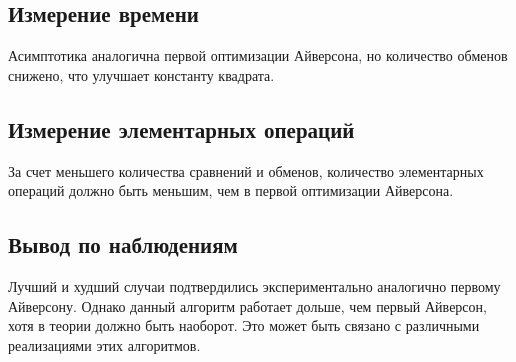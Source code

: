 \documentclass[11pt]{article}
\begin{document}
\setcounter{subsection}{0}
\subsection{Измерение времени}

\begin{center}
\end{center}
{ \hspace*{\fill} }

\begin{center}
\end{center}
{ \hspace*{\fill} }

Асимптотика аналогична первой оптимизации Айверсона, но количество обменов снижено, что
улучшает константу квадрата.

\subsection{Измерение элементарных операций}

\begin{center}
\end{center}
{ \hspace*{\fill} }

\begin{center}
\end{center}
{ \hspace*{\fill} }

За счет меньшего количества сравнений и обменов, количество элементарных операций должно
быть меньшим, чем в первой оптимизации Айверсона.

\subsection{Вывод по наблюдениям}

Лучший и худший случаи подтвердились экспериментально аналогично первому Айверсону. Однако 
данный алгоритм работает дольше, чем первый Айверсон, хотя в теории должно быть наоборот. Это может
быть связано с различными реализациями этих алгоритмов.

\newpage

\setcounter{section}{5}
\end{document}
